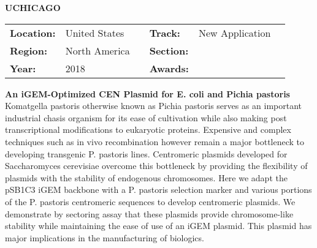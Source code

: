 \textbf{\uppercase{UChicago}} \FloatBarrier \begin{table}[h] \begin{tabular}{lp{2.5cm}llll} \textbf{Location:} & United States & \multicolumn{1}{|l}{} & \textbf{Track:}   & New Application \\ \textbf{Region:}   & North America   & \multicolumn{1}{|l}{} & \textbf{Section:} &  \\ \textbf{Year:}     & 2018   & \multicolumn{1}{|l}{} & \textbf{Awards:}  & \end{tabular} \end{table} \FloatBarrier \noindent\textbf{An iGEM-Optimized CEN Plasmid for E. coli and Pichia pastoris} \vspace{.2cm}\\ 
Komatgella pastoris otherwise known as Pichia pastoris serves as an important industrial chasis organism for its ease of cultivation while also making post transcriptional modifications to eukaryotic proteins. Expensive and complex techniques such as in vivo recombination however remain a major bottleneck to developing transgenic P. pastoris lines. Centromeric plasmids developed for Saccharomyces cerevisiae overcome this bottleneck by providing the flexibility of plasmids with the stability of endogenous chromosomes. Here we adapt the pSB1C3 iGEM backbone with a P. pastoris selection marker and various portions of the P. pastoris centromeric sequences to develop centromeric plasmids. We demonstrate by sectoring assay that these plasmids provide chromosome-like stability while maintaining the ease of use of an iGEM plasmid. This plasmid has major implications in the  manufacturing of biologics.
\vspace{2cm}

